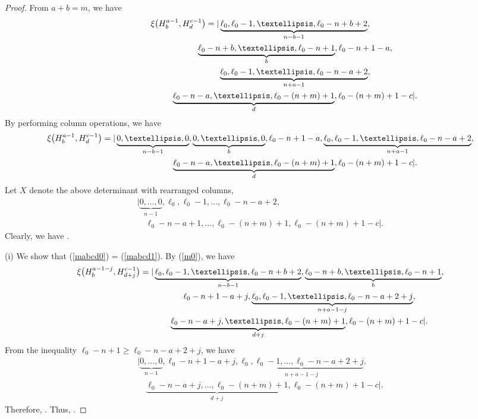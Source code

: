 \documentclass[10pt,a4paper]{amsart}
\begin{document}
\begin{proof}
From $a+b=m$, we have
\begin{gather}
\xi\bigl(H^{a-1}_{b},H^{c-1}_{d}\bigr)=|\underbrace{\ell_{0},\ell_{0}-1,\dots,\ell_{0}-n+b+2}_{n-b-1},\nonumber\\
\hphantom{\xi\bigl(H^{a-1}_{b},H^{c-1}_{d}\bigr)=|}{}
\underbrace{\ell_{0}-n+b,\dots,\ell_{0}-n+1}_{b},\ell_{0}-n+1-a,\nonumber\\
\hphantom{\xi\bigl(H^{a-1}_{b},H^{c-1}_{d}\bigr)=|}{}
\underbrace{\ell_{0},\ell_{0}-1,\dots,\ell_{0}-n-a+2}_{n+a-1},\nonumber\\
\hphantom{\xi\bigl(H^{a-1}_{b},H^{c-1}_{d}\bigr)=|}{}
\underbrace{\ell_{0}-n-a,\dots,\ell_{0}-(n+m)+1}_{d},\ell_{0}-(n+m)+1-c|.
\label{m0}
\end{gather}
By performing column operations, we have
\begin{gather*}
\xi\bigl(H^{a-1}_{b},H^{c-1}_{d}\bigr)=|\underbrace{0,\dots,0}_{n-b-1},%
\underbrace{0,\dots,0}_{b},\ell_{0}-n+1-a,
\underbrace{\ell_{0},\ell_{0}-1,\dots,\ell_{0}-n-a+2}_{n+a-1},\nonumber\\
\hphantom{\xi\bigl(H^{a-1}_{b},H^{c-1}_{d}\bigr)=|}{}
\underbrace{\ell_{0}-n-a,\dots,\ell_{0}-(n+m)+1}_{d},\ell_{0}-(n+m)+1-c|\nonumber.
\end{gather*}
Let $X$ denote the above determinant with rearranged columns,
\begin{gather*}
| \underbrace{0,\dots,0}_{n-1},
\ell_{0},\ell_{0}-1,\dots,\ell_{0}-n-a+2,\\
\quad{}\ell_{0}-n-a+1,\dots,\ell_{0}-(n+m)+1,\ell_{0}-(n+m)+1-c|\nonumber.
\end{gather*}
Clearly, we have
.

(i) We show that (\ref{mabcd0}) = (\ref{mabcd1}). By (\ref{m0}), we have
\begin{gather*}
\xi\bigl(H^{a-1-j}_{b},H^{c-1}_{d+j}\bigr)=|\underbrace{\ell_{0},\ell_{0}-1,\dots,\ell_{0}-n+b+2}_{n-b-1},\underbrace{\ell_{0}-n+b,\dots,\ell_{0}-n+1}_{b},\nonumber\\
\hphantom{\xi\bigl(H^{a-1-j}_{b},H^{c-1}_{d+j}\bigr)=|}{}\,
\ell_{0}-n+1-a+j,\underbrace{\ell_{0},\ell_{0}-1,\dots,\ell_{0}-n-a+2+j}_{n+a-1-j},\nonumber\\
\hphantom{\xi\bigl(H^{a-1-j}_{b},H^{c-1}_{d+j}\bigr)=|}{}
\underbrace{\ell_{0}-n-a+j,\dots,\ell_{0}-(n+m)+1}_{d+j},\ell_{0}-(n+m)+1-c|\nonumber.
\end{gather*}
From the inequality $\ell_0-n+1\geq\ell_0-n-a+2+j$, we have
\begin{gather*}
|\underbrace{0,\dots,0}_{n-1},\ell_{0}-n+1-a+j,\underbrace{\ell_{0},\ell_{0}-1,\dots,\ell_{0}-n-a+2+j}_{n+a-1-j},\nonumber\\
\quad{}\underbrace{\ell_{0}-n-a+j,\dots,\ell_{0}-(n+m)+1}_{d+j},\ell_{0}-(n+m)+1-c|\nonumber.
\end{gather*}
Therefore, . Thus, .


\end{proof}
\end{document}
